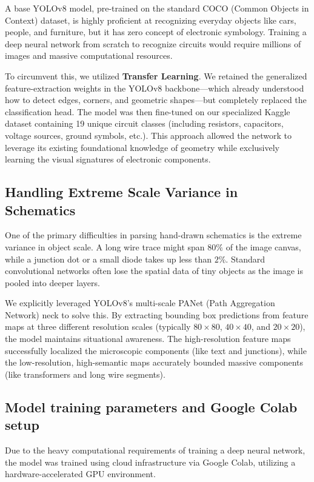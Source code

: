 \documentclass[12pt]{article}
\begin{document}
A base YOLOv8 model, pre-trained on the standard COCO (Common Objects in Context) dataset, is highly proficient at recognizing everyday objects like cars, people, and furniture, but it has zero concept of electronic symbology. Training a deep neural network from scratch to recognize circuits would require millions of images and massive computational resources.

To circumvent this, we utilized \textbf{Transfer Learning}. We retained the generalized feature-extraction weights in the YOLOv8 backbone—which already understood how to detect edges, corners, and geometric shapes—but completely replaced the classification head. The model was then fine-tuned on our specialized Kaggle dataset containing 19 unique circuit classes (including resistors, capacitors, voltage sources, ground symbols, etc.). This approach allowed the network to leverage its existing foundational knowledge of geometry while exclusively learning the visual signatures of electronic components.

\subsection{Handling Extreme Scale Variance in Schematics}

One of the primary difficulties in parsing hand-drawn schematics is the extreme variance in object scale. A long wire trace might span $80\%$ of the image canvas, while a junction dot or a small diode takes up less than $2\%$. Standard convolutional networks often lose the spatial data of tiny objects as the image is pooled into deeper layers.

We explicitly leveraged YOLOv8’s multi-scale PANet (Path Aggregation Network) neck to solve this. By extracting bounding box predictions from feature maps at three different resolution scales (typically $80 \times 80$, $40 \times 40$, and $20 \times 20$), the model maintains situational awareness. The high-resolution feature maps successfully localized the microscopic components (like text and junctions), while the low-resolution, high-semantic maps accurately bounded massive components (like transformers and long wire segments).

\subsection{Model training parameters and Google Colab setup}

Due to the heavy computational requirements of training a deep neural network, the model was trained using cloud infrastructure via Google Colab, utilizing a hardware-accelerated GPU environment.
\end{document}
